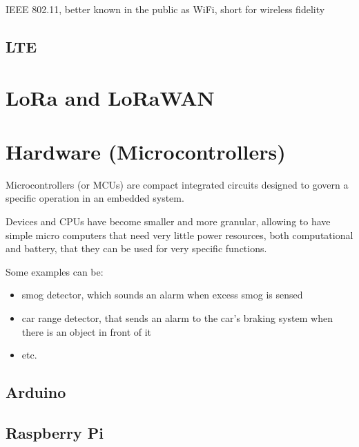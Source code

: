 	IEEE 802.11, better known in the public as WiFi, short for wireless fidelity
	
	\subsection{LTE}
	


\section{LoRa and LoRaWAN}

\section{Hardware (Microcontrollers)}

	Microcontrollers (or MCUs) are compact integrated circuits designed to govern a specific operation in an embedded system.
	
	Devices and CPUs have become smaller and more granular, allowing to have simple micro computers that need very little power resources, both computational and battery, that they can be used for very specific functions.
	
	Some examples can be:
	\begin{itemize}
		\item smog detector, which sounds an alarm when excess smog is sensed
		\item car range detector, that sends an alarm to the car's braking system when there is an object in front of it
		\item etc.
	\end{itemize}

	\subsection{Arduino}
	
		
	
	\subsection{Raspberry Pi}
		
